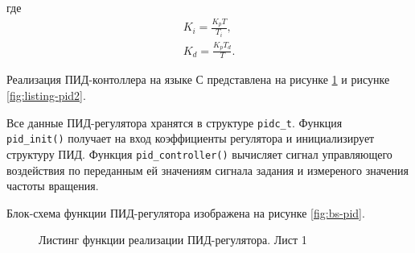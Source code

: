         где
        \begin{gather*}
            K_i = \frac{K_p T}{T_i},\\
            K_d = \frac{K_p T_d}{T}.
        \end{gather*}

        Реализация ПИД-контоллера на языке С представлена на рисунке \ref{fig:listing-pid1} и
        рисунке \ref{fig:listing-pid2}.

        Все данные ПИД-регулятора хранятся в структуре \verb"pidс_t". Функция\\
        \verb"pid_init()" получает на вход коэффициенты регулятора и
        инициализирует структуру ПИД. Функция \verb"pid_controller()" вычисляет
        сигнал управляющего воздействия по переданным ей значениям сигнала
        задания и измереного значения частоты вращения.

        Блок-схема функции ПИД-регулятора изображена на рисунке \ref{fig:bs-pid}.

        \begin{figure}[ph!]
            \caption{Листинг функции реализации ПИД-регулятора. Лист 1}
            \label{fig:listing-pid1}
        \end{figure}

